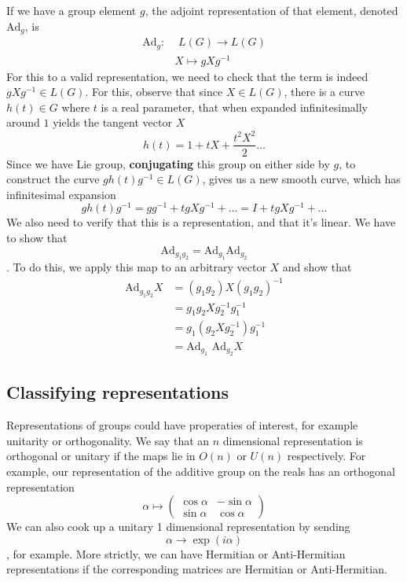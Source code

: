 \documentclass[11pt, oneside]{article}   	%
\theoremstyle{slanted}
\begin{document}
If we have a group element $g$, the adjoint representation of that element, denoted $\text{Ad}_g$, is 
\begin{align*} 
\text{Ad}_g :&  \, \, L(G) \rightarrow L(G)  \\ 
& X \mapsto g X g^ { -1 }  
\end{align*} 
For this to a valid representation, we need to check that the term is indeed $gXg^{-1} \in L(G)$. For this, observe that since $X \in L(G)$, there is a curve $h(t) \in G$ where $t$ is a real parameter, that when expanded infinitesimally around $1$ yields the tangent vector $X$ \[ h(t) = 1 + tX + \frac{ t^2 X^2}{ 2} \dots \] 
Since we have Lie group, \textbf{conjugating} this group on either side by $g$, to construct the curve $g  h(t) g^ { -1}  \in L(G) $, gives us a new smooth curve, which has infinitesimal expansion \[ g h(t) g^{-1}  = g g^{-1}  + t g X g^ {-1}  + \dots = I + t g X g^ {-1}  + \dots \]
We also need to verify that this is a representation, and that it's linear. We have to show that \[ \text{Ad}_{g_1 g_2} = \text{Ad}_{ g_1} \text{Ad} _{g_ 2} \]. To do this, we apply this map to an arbitrary vector $X$ and show that
\begin{align*} 
\text{Ad}_{g_1 g_2} X & = (g_1 g_2) X (g_1 g_2)^ { -1} \\
	& = g_1 g_2 X g_2^{-1} g_1^{-1} \\ 
	& = g_1 ( g_2 X g_2^{-1} ) g_1^{-1} \\ 
	& = \text{Ad}_{g_1} \text{ Ad} _{g_2} X 
\end{align*}  

\subsection{Classifying representations}
Representations of groups could have properaties of interest, for example unitarity or orthogonality. We say that an $n$ dimensional representation is orthogonal or unitary if the maps lie in $O(n)$ or $U(n) $ respectively. For example, our representation of the additive group on the reals has an orthogonal representation \[ \alpha \mapsto \begin{pmatrix} \cos \alpha & -\sin \alpha \\ \sin \alpha & \cos \alpha \end{pmatrix} \] 
We can also cook up a unitary 1 dimensional representation by sending \[ \alpha \rightarrow \exp ( i \alpha )\], for example. More strictly, we can have Hermitian or Anti-Hermitian representations if the corresponding matrices are Hermitian or Anti-Hermitian. 
\end{document}
